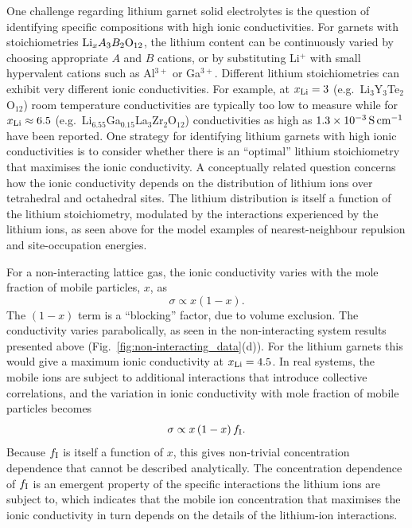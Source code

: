 \documentclass[aps,prb,twocolumn,superscriptaddress,reprint]{revtex4-1}
\newcommand{\xLi}{x_\m{Li}}
\begin{document}
One challenge regarding lithium garnet solid electrolytes is the question of identifying specific compositions with high ionic conductivities. For garnets with stoichiometries $\mathrm{Li}_xA_3B_2\mathrm{O}_{12}$, the lithium content can be continuously varied by choosing appropriate $A$ and $B$ cations, or by substituting Li$^+$ with small hypervalent cations such as Al$^{3+}$ or Ga$^{3+}$. Different lithium stoichiometries can exhibit very different ionic conductivities. For example, at $\xLi=3$ (e.g.\ Li$_3$Y$_3$Te$_2$O$_{12}$) room temperature conductivities are typically too low to measure\cite{OCallaghanEtAl_ChemMater2006,BachmanEtAl_ChemRev2016,ThangaduraiEtAl_JPhysChemLett2015} 
while for $\xLi\approx6.5$ (e.g.\ Li$_{6.55}$Ga$_{0.15}$La$_3$Zr$_2$O$_{12}$) conductivities as high as $1.3\times10^{-3}\,\mathrm{S}\,\mathrm{cm}^{-1}$ have been reported.\cite{Bernuy-LopezEtAl_ChemMater2014,RettenwanderEtAl_InorgChem2014} One strategy for identifying lithium garnets with high ionic conductivities is to consider whether there is an ``optimal'' lithium stoichiometry that maximises the ionic conductivity.\cite{MuruganEtAl_JElectrochemSoc2008,MuruganEtAl_Ionics2007,RamakumarEtAl_DaltonTrans2015,MiaraEtAl_ChemMater2013,XieEtAl_ChemMater2011,MuruganEtAl_MaterSciEngB2007,OCallaghanAndCussen_ChemComm2007,XuEtAl_PhysRevB2012,ChenEtAl_SciRep2017} A conceptually related question concerns how the ionic conductivity depends on the distribution of lithium ions over tetrahedral and octahedral sites.\cite{ChenEtAl_ChemMater2015,ThangaduraiEtAl_JAmCeramSoc2003,MuruganEtAl_MaterSciEngB2007,OCallaghanAndCussen_ChemComm2007} The lithium distribution is itself a function of the lithium stoichiometry, modulated by the interactions experienced by the lithium ions, as seen above for the model examples of nearest-neighbour repulsion and site-occupation energies.
 
For a non-interacting lattice gas, the ionic conductivity varies with the mole fraction of mobile particles, $x$, as
\begin{equation}
  \sigma \propto x \left(1-x\right).
\end{equation}
The $(1-x)$ term is a ``blocking'' factor, due to volume exclusion.\cite{Kutner_PhysLett1981} The conductivity varies parabolically, as seen in the non-interacting system results presented above (Fig.\ \ref{fig:non-interacting_data}(d)). For the lithium garnets this would give a maximum ionic conductivity at $\xLi=4.5$. In real systems, the mobile ions are subject to additional interactions that introduce collective correlations, and the variation in ionic conductivity with mole fraction of mobile particles becomes
\begin{equation}
  \sigma \propto x \left(1-x\right)f_{\mathrm{I}}.
  \label{eqn:sigma_conc_dependence}
\end{equation}
Because $f_{\mathrm{I}}$ is itself a function of $x$, this gives non-trivial concentration dependence that cannot be described analytically. The concentration dependence of $f_{\mathrm{I}}$ is an emergent property of the specific interactions the lithium ions are subject to, which indicates that the mobile ion concentration that maximises the ionic conductivity in turn depends on the details of the lithium-ion interactions. 
\end{document}
